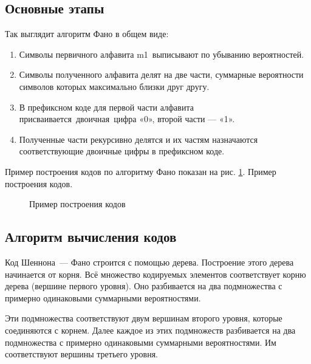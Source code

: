 \documentclass{article}
\begin{document}
\subsection{Основные этапы}
Так выглядит алгоритм Фано в общем виде:
\begin{enumerate}
 \item Символы первичного алфавита m1 выписывают по убыванию вероятностей.
 \item Символы полученного алфавита делят на две части, суммарные вероятности 
 символов которых максимально близки друг другу.
 \item В префиксном коде для первой части алфавита присваивается двоичная цифра «0», 
 второй части --- «1».
 \item Полученные части рекурсивно делятся и их частям назначаются соответствующие 
 двоичные цифры в префиксном коде.\\
\end{enumerate}
Пример построения кодов по алгоритму Фано показан на рис. \ref{codesex}. Пример построения кодов.

\begin{figure}[H]
  \caption{Пример построения кодов\label{codesex}}
\end{figure}


\newpage
\subsection{Алгоритм вычисления кодов}

Код Шеннона — Фано строится с помощью дерева. Построение этого дерева начинается от корня. 
Всё множество кодируемых элементов соответствует корню дерева (вершине первого уровня). 
Оно разбивается на два подмножества с примерно одинаковыми суммарными вероятностями. 

Эти подмножества соответствуют двум вершинам второго уровня, которые соединяются с корнем. 
Далее каждое из этих подмножеств разбивается на два подмножества с примерно одинаковыми 
суммарными вероятностями. Им соответствуют вершины третьего уровня. 
\end{document}
